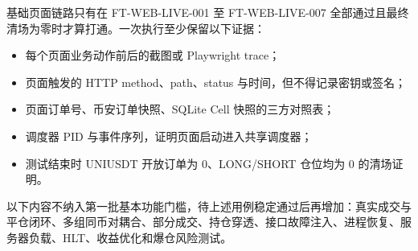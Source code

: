 基础页面链路只有在 FT-WEB-LIVE-001 至 FT-WEB-LIVE-007 全部通过且最终清场为零时才算打通。一次执行至少保留以下证据：

\begin{itemize}
  \item 每个页面业务动作前后的截图或 Playwright trace；
  \item 页面触发的 HTTP method、path、status 与时间，但不得记录密钥或签名；
  \item 页面订单号、币安订单快照、SQLite Cell 快照的三方对照表；
  \item 调度器 PID 与事件序列，证明页面启动进入共享调度器；
  \item 测试结束时 UNIUSDT 开放订单为 0、LONG/SHORT 仓位均为 0 的清场证明。
\end{itemize}

以下内容不纳入第一批基本功能门槛，待上述用例稳定通过后再增加：真实成交与平仓闭环、多组同币对耦合、部分成交、持仓穿透、接口故障注入、进程恢复、服务器负载、HLT、收益优化和爆仓风险测试。
